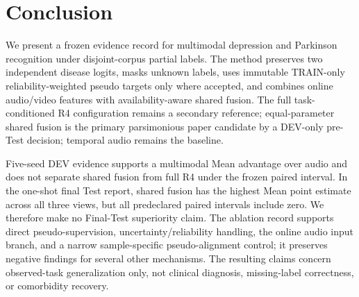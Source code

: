 \section{Conclusion}

We present a frozen evidence record for multimodal depression and Parkinson recognition under disjoint-corpus partial labels. The method preserves two independent disease logits, masks unknown labels, uses immutable TRAIN-only reliability-weighted pseudo targets only where accepted, and combines online audio/video features with availability-aware shared fusion. The full task-conditioned R4 configuration remains a secondary reference; equal-parameter shared fusion is the primary parsimonious paper candidate by a DEV-only pre-Test decision; temporal audio remains the baseline.

Five-seed DEV evidence supports a multimodal Mean advantage over audio and does not separate shared fusion from full R4 under the frozen paired interval. In the one-shot final Test report, shared fusion has the highest Mean point estimate across all three views, but all predeclared paired intervals include zero. We therefore make no Final-Test superiority claim. The ablation record supports direct pseudo-supervision, uncertainty/reliability handling, the online audio input branch, and a narrow sample-specific pseudo-alignment control; it preserves negative findings for several other mechanisms. The resulting claims concern observed-task generalization only, not clinical diagnosis, missing-label correctness, or comorbidity recovery.

